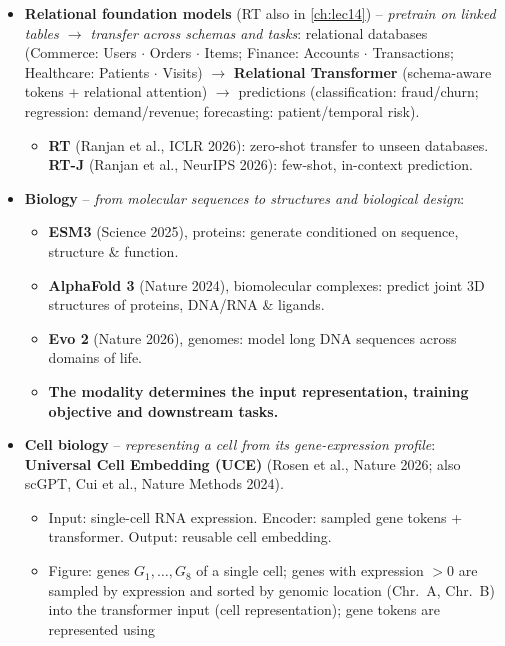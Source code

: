 \begin{itemize}
  \item \textbf{Relational foundation models} (RT also in \cref{ch:lec14}) --
    \emph{pretrain on linked tables $\to$ transfer across schemas and tasks}:
    relational databases (Commerce: Users $\cdot$ Orders $\cdot$ Items; Finance:
    Accounts $\cdot$ Transactions; Healthcare: Patients $\cdot$ Visits) $\to$
    \textbf{Relational Transformer} (schema-aware tokens + relational attention) $\to$
    predictions (classification: fraud/churn; regression: demand/revenue; forecasting:
    patient/temporal risk).
    \begin{itemize}
      \item \textbf{RT} (Ranjan et al., ICLR 2026): zero-shot transfer to unseen
        databases. \textbf{RT-J} (Ranjan et al., NeurIPS 2026): few-shot, in-context
        prediction.
    \end{itemize}
  \item \textbf{Biology} -- \emph{from molecular sequences to structures and biological
    design}:
    \begin{itemize}
      \item \textbf{ESM3} (Science 2025), proteins: generate conditioned on sequence,
        structure \& function.
      \item \textbf{AlphaFold 3} (Nature 2024), biomolecular complexes: predict joint 3D
        structures of proteins, DNA/RNA \& ligands.
      \item \textbf{Evo 2} (Nature 2026), genomes: model long DNA sequences across
        domains of life.
      \item \textbf{The modality determines the input representation, training objective
        and downstream tasks.}
    \end{itemize}
  \item \textbf{Cell biology} -- \emph{representing a cell from its gene-expression
    profile}: \textbf{Universal Cell Embedding (UCE)} (Rosen et al., Nature 2026; also
    scGPT, Cui et al., Nature Methods 2024).
    \begin{itemize}
      \item Input: single-cell RNA expression. Encoder: sampled gene tokens +
        transformer. Output: reusable cell embedding.
      \item Figure: genes $G_1,\dots,G_8$ of a single cell; genes with expression $>0$
        are sampled by expression and sorted by genomic location (Chr.\ A, Chr.\ B) into
        the transformer input (cell representation); gene tokens are represented using

\end{itemize}
\end{itemize}
